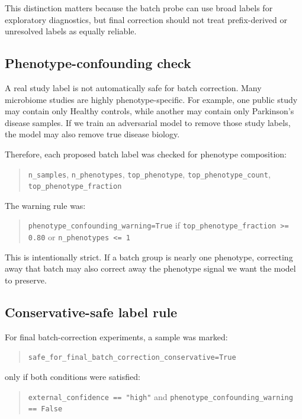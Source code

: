 \documentclass[11pt]{article}
\newcommand{\code}[1]{\texttt{\small #1}}
\begin{document}
This distinction matters because the batch probe can use broad labels for exploratory
diagnostics, but final correction should not treat prefix-derived or unresolved labels as
equally reliable.

\subsection{Phenotype-confounding check}

A real study label is not automatically safe for batch correction. Many microbiome
studies are highly phenotype-specific. For example, one public study may contain only
Healthy controls, while another may contain only Parkinson's disease samples. If we train
an adversarial model to remove those study labels, the model may also remove true disease
biology.

Therefore, each proposed batch label was checked for phenotype composition:

\begin{quote}
\code{n\_samples}, \code{n\_phenotypes}, \code{top\_phenotype},
\code{top\_phenotype\_count}, \code{top\_phenotype\_fraction}
\end{quote}

The warning rule was:

\begin{quote}
\code{phenotype\_confounding\_warning=True} if
\code{top\_phenotype\_fraction >= 0.80} or \code{n\_phenotypes <= 1}
\end{quote}

This is intentionally strict. If a batch group is nearly one phenotype, correcting away
that batch may also correct away the phenotype signal we want the model to preserve.

\subsection{Conservative-safe label rule}

For final batch-correction experiments, a sample was marked:

\begin{quote}
\code{safe\_for\_final\_batch\_correction\_conservative=True}
\end{quote}

only if both conditions were satisfied:

\begin{quote}
\code{external\_confidence == "high"} and
\code{phenotype\_confounding\_warning == False}
\end{quote}
\end{document}
